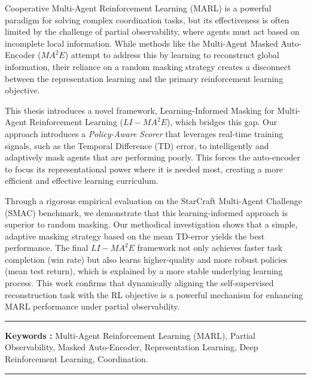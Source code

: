 


Cooperative Multi-Agent Reinforcement Learning (MARL) is a powerful paradigm for solving complex coordination tasks, but its effectiveness is often limited by the challenge of partial observability, where agents must act based on incomplete local information. While methods like the Multi-Agent Masked Auto-Encoder (${MA}^2E$) attempt to address this by learning to reconstruct global information, their reliance on a  random masking strategy creates a disconnect between the representation learning and the primary reinforcement learning objective.

This thesis introduces a novel framework, Learning-Informed Masking for Multi-Agent Reinforcement Learning ($LI-{MA}^2E$), which bridges this gap. Our approach introduces a \textit{Policy-Aware Scorer} that leverages real-time training signals, such as the Temporal Difference (TD) error, to intelligently and adaptively mask agents that are performing poorly. This forces the auto-encoder to focus its representational power where it is needed most, creating a more efficient and effective learning curriculum.

Through a rigorous empirical evaluation on the StarCraft Multi-Agent Challenge (SMAC) benchmark, we demonstrate that this learning-informed approach is superior to random masking. Our methodical investigation shows that a simple, adaptive masking strategy based on the mean TD-error yields the best performance. The final $LI-{MA}^2E$ framework not only achieves faster task completion (win rate) but also learns higher-quality and more robust policies (mean test return), which is explained by a more stable underlying learning process. This work confirms that dynamically aligning the self-supervised reconstruction task with the RL objective is a powerful mechanism for enhancing MARL performance under partial observability.



\vspace{1cm}



\noindent\rule[2pt]{\textwidth}{0.5pt}

{\textbf{Keywords :}}
Multi-Agent Reinforcement Learning (MARL), Partial Observability, Masked Auto-Encoder, Representation Learning, Deep Reinforcement Learning, Coordination.
\\
\noindent\rule[2pt]{\textwidth}{0.5pt}
\clearpage



